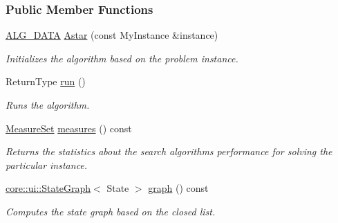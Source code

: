 \subsubsection*{Public Member Functions}
\begin{DoxyCompactItemize}
\item 
\hyperlink{algorithm_8h_a64c012078deee9a30405e18ec11e6360}{A\+L\+G\+\_\+\+D\+A\+TA} \hyperlink{structslb_1_1ext_1_1algorithm_1_1Astar_ab5010c34a6da4a9de9937856c8f1af8f}{Astar} (const My\+Instance \&instance)
\begin{DoxyCompactList}\small\item\em Initializes the algorithm based on the problem instance. \end{DoxyCompactList}\item 
Return\+Type \hyperlink{structslb_1_1ext_1_1algorithm_1_1Astar_af46d0fe401539d7ae297dc4d059f5b5f}{run} ()
\begin{DoxyCompactList}\small\item\em Runs the algorithm. \end{DoxyCompactList}\item 
\hyperlink{structslb_1_1core_1_1sb_1_1MeasureSet}{Measure\+Set} \hyperlink{structslb_1_1ext_1_1algorithm_1_1Astar_a936b71c860389ebadb17ee8afaba875f}{measures} () const 
\begin{DoxyCompactList}\small\item\em Returns the statistics about the search algorithm\textquotesingle{}s performance for solving the particular instance. \end{DoxyCompactList}\item 
\hyperlink{structslb_1_1core_1_1ui_1_1StateGraph}{core\+::ui\+::\+State\+Graph}$<$ State $>$ \hyperlink{structslb_1_1ext_1_1algorithm_1_1Astar_a15d6101b6dc84cb71e290c3fcdcb44b9}{graph} () const 
\begin{DoxyCompactList}\small\item\em Computes the state graph based on the closed list. \end{DoxyCompactList}\end{DoxyCompactItemize}
